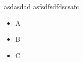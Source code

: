 \documentclass[
]{article}
\providecommand{\tightlist}{%
  \setlength{\itemsep}{0pt}\setlength{\parskip}{0pt}}
\begin{document}
asdasdad asfsdfsdfdscsafc

\begin{itemize}
\tightlist
\item
  A
\item
  B
\item
  C
\end{itemize}





%
%
%




\listoffigures
\listoftables

\appendix
% 
\end{document}
